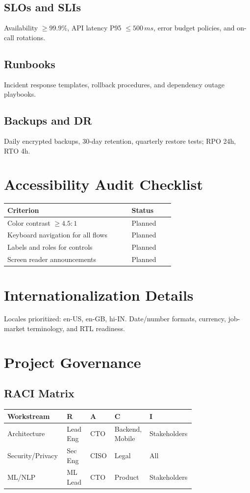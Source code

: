 \documentclass[12pt,a4paper]{article}
\begin{document}
\subsection{SLOs and SLIs}
Availability \(\geq 99.9\%\), API latency P95 \(\leq 500\,ms\), error budget policies, and on-call rotations.
\subsection{Runbooks}
Incident response templates, rollback procedures, and dependency outage playbooks.
\subsection{Backups and DR}
Daily encrypted backups, 30-day retention, quarterly restore tests; RPO 24h, RTO 4h.

\section{Accessibility Audit Checklist}
\begin{longtable}{p{0.64\linewidth} p{0.22\linewidth}}
\toprule
\textbf{Criterion} & \textbf{Status}\\
\midrule
Color contrast \(\geq 4.5:1\) & Planned\\
Keyboard navigation for all flows & Planned\\
Labels and roles for controls & Planned\\
Screen reader announcements & Planned\\
\bottomrule
\end{longtable}

\section{Internationalization Details}
Locales prioritized: en-US, en-GB, hi-IN. Date/number formats, currency, job-market terminology, and RTL readiness.

\section{Project Governance}
\subsection{RACI Matrix}
\begin{longtable}{p{0.28\linewidth} p{0.12\linewidth} p{0.12\linewidth} p{0.12\linewidth} p{0.12\linewidth}}
\toprule
\textbf{Workstream} & \textbf{R} & \textbf{A} & \textbf{C} & \textbf{I}\\
\midrule
Architecture & Lead Eng & CTO & Backend, Mobile & Stakeholders\\
Security/Privacy & Sec Eng & CISO & Legal & All\\
ML/NLP & ML Lead & CTO & Product & Stakeholders\\
\bottomrule
\end{longtable}
\end{document}
